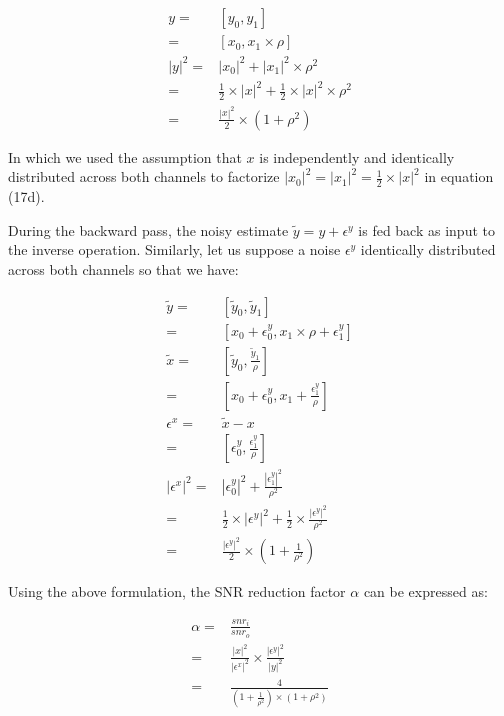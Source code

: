 \documentclass[twocolumn]{bmcart}
\begin{document}
\begin{backmatter}
\begin{subequations}
\begin{align}
 y =& [y_0, y_1] \\
   =& [x_0, x_1 \times \rho] \\
|y|^2 =& |x_0|^2 + |x_1|^2 \times \rho^2 \\
      =& \frac{1}{2} \times |x|^2 + \frac{1}{2} \times |x|^2 \times \rho^2 \\
      =& \frac{|x|^2}{2} \times (1+\rho^2)
\end{align}
\end{subequations}

In which we used the assumption that $x$ is independently and identically distributed across both channels
to factorize $|x_0|^2 = |x_1|^2 = \frac{1}{2} \times |x|^2$ in equation (17d).

During the backward pass, the noisy estimate $\tilde{y}=y+\epsilon^y$ is fed back as input to the inverse operation.
Similarly, let us suppose a noise $\epsilon^y$ identically distributed across both channels so that we have:

\begin{subequations}
\begin{align}
\tilde{y}       =& [ \tilde{y}_0, \tilde{y}_1 ] \\
                =& [ x_0 + \epsilon_0^y, x_1 \times \rho + \epsilon_1^y ] \\
\tilde{x}       =& [ \tilde{y}_0, \frac{\tilde{y}_1}{\rho}] \\
                =& [ x_0 + \epsilon_{0}^y, x_1 + \frac{\epsilon_{1}^y}{\rho} ]\\
\epsilon^x      =& \tilde{x} - x\\
                =& [ \epsilon_0^y, \frac{\epsilon_{1}^y}{\rho} ]\\
|\epsilon^x|^2  =& |\epsilon_0^y|^2 + \frac{|\epsilon_1^y|^2}{\rho^2} \\
                =& \frac{1}{2} \times |\epsilon^y|^2 + \frac{1}{2} \times \frac{|\epsilon^y|^2}{\rho^2} \\
                =& \frac{|\epsilon^y|^2}{2} \times (1 + \frac{1}{\rho^2})
\end{align}
\end{subequations}

Using the above formulation, the SNR reduction factor $\alpha$ can be expressed as:

\begin{subequations}
\begin{align}
\alpha =& \frac{snr_i}{snr_o} \\
 =& \frac{|x|^2}{|\epsilon^x|^2} \times  \frac{|\epsilon^y|^2}{|y|^2} \\
 =& \frac{4}{(1+\frac{1}{\rho^2}) \times (1 + \rho^2)}
\end{align}
\end{subequations}


\end{backmatter}
\end{document}

